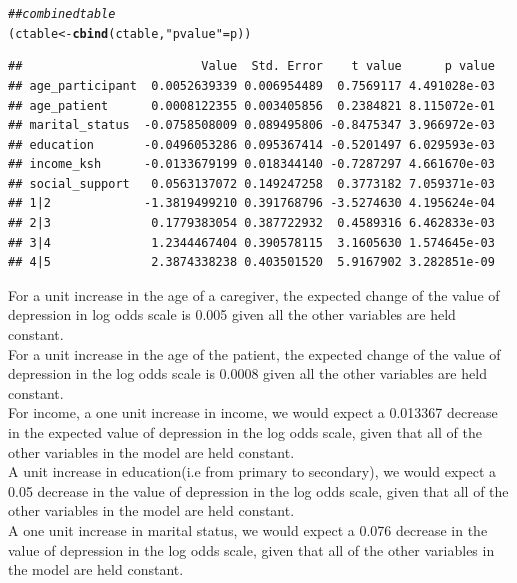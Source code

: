 \documentclass[12pt]{article}\usepackage[]{graphicx}\usepackage[]{xcolor}
\makeatletter
\newcommand{\hlstr}[1]{\textcolor[rgb]{0.192,0.494,0.8}{#1}}%
\newcommand{\hlcom}[1]{\textcolor[rgb]{0.678,0.584,0.686}{\textit{#1}}}%
\newcommand{\hlstd}[1]{\textcolor[rgb]{0.345,0.345,0.345}{#1}}%
\newcommand{\hlkwb}[1]{\textcolor[rgb]{0.69,0.353,0.396}{#1}}%
\newcommand{\hlkwd}[1]{\textcolor[rgb]{0.737,0.353,0.396}{\textbf{#1}}}%
\newenvironment{kframe}{%
 \def\at@end@of@kframe{}%
 \ifinner\ifhmode%
  \def\at@end@of@kframe{\end{minipage}}%
  \begin{minipage}{\columnwidth}%
 \fi\fi%
 \def\FrameCommand##1{\hskip\@totalleftmargin \hskip-\fboxsep
 \colorbox{shadecolor}{##1}\hskip-\fboxsep
     \hskip-\linewidth \hskip-\@totalleftmargin \hskip\columnwidth}%
 \MakeFramed {\advance\hsize-\width
   \@totalleftmargin\z@ \linewidth\hsize
   \@setminipage}}%
 {\par\unskip\endMakeFramed%
 \at@end@of@kframe}
\newenvironment{knitrout}{}{} %
\numberwithin{equation}{section}
\numberwithin{figure}{section}
\makeatother
\begin{document}
\begin{knitrout}
\color{fgcolor}\begin{kframe}
\begin{alltt}
\hlcom{## combined table}
\hlstd{(ctable} \hlkwb{<-} \hlkwd{cbind}\hlstd{(ctable,} \hlstr{"p value"} \hlstd{= p))}
\end{alltt}
\begin{verbatim}
##                         Value  Std. Error    t value      p value
## age_participant  0.0052639339 0.006954489  0.7569117 4.491028e-03
## age_patient      0.0008122355 0.003405856  0.2384821 8.115072e-01
## marital_status  -0.0758508009 0.089495806 -0.8475347 3.966972e-03
## education       -0.0496053286 0.095367414 -0.5201497 6.029593e-03
## income_ksh      -0.0133679199 0.018344140 -0.7287297 4.661670e-03
## social_support   0.0563137072 0.149247258  0.3773182 7.059371e-03
## 1|2             -1.3819499210 0.391768796 -3.5274630 4.195624e-04
## 2|3              0.1779383054 0.387722932  0.4589316 6.462833e-03
## 3|4              1.2344467404 0.390578115  3.1605630 1.574645e-03
## 4|5              2.3874338238 0.403501520  5.9167902 3.282851e-09
\end{verbatim}
\end{kframe}
\end{knitrout}

\noindent For a unit increase in the age of a caregiver, the expected change of the value of depression in log odds scale is 0.005 given all the other variables are held constant.\\

\noindent For a unit increase in the age of the patient, the expected change of the value of depression in the log odds scale is 0.0008 given all the other variables are held constant.\\

\noindent For income, a one unit increase in income, we would expect a 0.013367 decrease in the expected value of depression in the log odds scale, given that all of the other variables in the model are held constant.\\

\noindent A unit increase in education(i.e from primary to secondary), we would expect a 0.05 decrease in the value of depression in the log odds scale, given that all of the other variables in the model are held constant.\\

 \noindent A one unit increase in marital status, we would expect a 0.076 decrease in the value of depression in the log odds scale, given that all of the other variables in the model are held constant.\\
\end{document}
